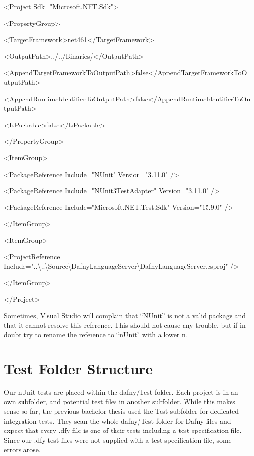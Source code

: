 \documentclass[]{book}
\begin{document}
\textless{}Project Sdk="Microsoft.NET.Sdk"\textgreater{}

\textless{}PropertyGroup\textgreater{}

\textless{}TargetFramework\textgreater{}net461\textless{}/TargetFramework\textgreater{}

\textless{}OutputPath\textgreater{}../../Binaries/\textless{}/OutputPath\textgreater{}

\textless{}AppendTargetFrameworkToOutputPath\textgreater{}false\textless{}/AppendTargetFrameworkToOutputPath\textgreater{}

\textless{}AppendRuntimeIdentifierToOutputPath\textgreater{}false\textless{}/AppendRuntimeIdentifierToOutputPath\textgreater{}

\textless{}IsPackable\textgreater{}false\textless{}/IsPackable\textgreater{}

\textless{}/PropertyGroup\textgreater{}

\textless{}ItemGroup\textgreater{}

\textless{}PackageReference Include="NUnit" Version="3.11.0" /\textgreater{}

\textless{}PackageReference Include="NUnit3TestAdapter" Version="3.11.0" /\textgreater{}

\textless{}PackageReference Include="Microsoft.NET.Test.Sdk" Version="15.9.0" /\textgreater{}

\textless{}/ItemGroup\textgreater{}

\textless{}ItemGroup\textgreater{}

\textless{}ProjectReference Include="..\textbackslash{}..\textbackslash{}Source\textbackslash{}DafnyLanguageServer\textbackslash{}DafnyLanguageServer.csproj" /\textgreater{}

\textless{}/ItemGroup\textgreater{}

\textless{}/Project\textgreater{}

Sometimes, Visual Studio will complain that ``NUnit'' is not a valid package and that it cannot resolve this reference. This should not cause any trouble, but if in doubt try to rename the reference to ``nUnit'' with a lower n.

\section{Test Folder Structure}\label{test-folder-structure}

Our nUnit tests are placed within the dafny/Test folder. Each project is in an own subfolder, and potential test files in another subfolder. While this makes sense so far, the previous bachelor thesis used the Test subfolder for dedicated integration tests. They scan the whole dafny/Test folder for Dafny files and expect that every .dfy file is one of their tests including a test specification file. Since our .dfy test files were not supplied with a test specification file, some errors arose.
\end{document}
